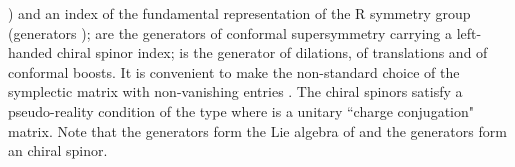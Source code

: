 \documentclass[a4paper,12pt]{article}
\begin{document}
\coordHE{}) and an index \coordHE{} of the fundamental
representation of the R symmetry group \coordHE{}
(generators \coordHE{}); \coordHE{} are the generators
of conformal supersymmetry carrying a left-handed chiral spinor
index; \coordHE{}  is the generator of dilations, \coordHE{} of
translations and \coordHE{} of conformal boosts. It is convenient to make the non-standard choice of
the symplectic matrix \coordHE{} with
non-vanishing entries \coordHE{}. The chiral spinors satisfy a pseudo-reality
condition of the type \coordHE{} where \coordHE{} is a \coordHE{}
unitary ``charge conjugation" matrix. Note that the generators \coordHE{} form the Lie algebra of \coordHE{} and the generators \coordHE{} form an \coordHE{} chiral spinor.
 
\end{document}
